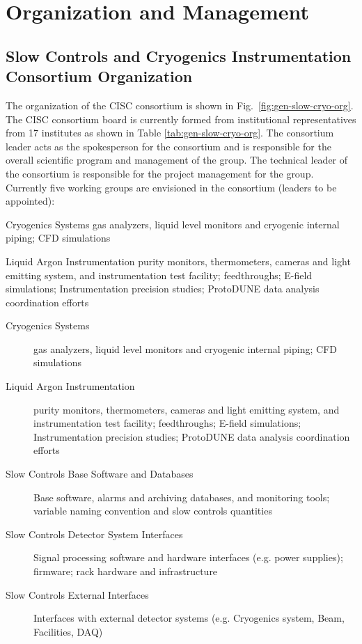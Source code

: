 \section{Organization and Management}
\label{sec:fdgen-slow-cryo-org}

\subsection{Slow Controls and Cryogenics Instrumentation Consortium Organization}
\label{sec:fdgen-slow-cryo-org-consortium}


The organization of the CISC consortium is shown in
Fig.\ \ref{fig:gen-slow-cryo-org}. The CISC consortium board is
currently formed from institutional representatives from 17 institutes
as shown in Table \ref{tab:gen-slow-cryo-org}. The consortium leader
acts as the spokesperson for the consortium and is responsible for the
overall scientific program and management of the group. The technical
leader of the consortium is responsible for the project management for
the group.  Currently five working groups are envisioned in the
consortium (leaders to be appointed):


Cryogenics Systems gas analyzers, liquid level monitors and cryogenic internal piping; CFD simulations

Liquid Argon Instrumentation purity monitors, thermometers, cameras and light emitting system, and instrumentation test facility; feedthroughs; E-field simulations; Instrumentation precision studies; ProtoDUNE data analysis coordination efforts




\begin{description}
 \item[Cryogenics Systems] gas analyzers, liquid level
  monitors and cryogenic internal piping; CFD simulations
 \item[Liquid Argon Instrumentation] purity monitors, thermometers,
   cameras and light emitting system, and instrumentation test facility;
   feedthroughs; E-field simulations;
   Instrumentation precision studies;
   ProtoDUNE data analysis coordination efforts
 \item [Slow Controls Base Software and Databases]  Base software, alarms and archiving databases, and monitoring tools;
   variable naming convention and slow controls quantities
 \item [Slow Controls Detector System Interfaces] Signal processing software and hardware interfaces (e.g. power supplies);
   firmware; rack hardware and infrastructure   
 \item [Slow Controls External Interfaces] Interfaces with external detector systems (e.g. Cryogenics system, Beam, Facilities, DAQ)
\end{description}

